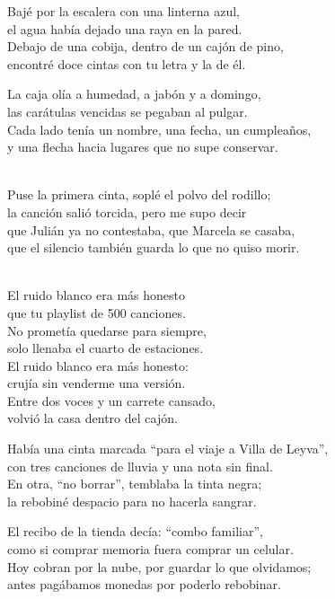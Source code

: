 \begin{lyrics}
Bajé por la escalera con una linterna azul,\\
el agua había dejado una raya en la pared.\\
Debajo de una cobija, dentro de un cajón de pino,\\
encontré doce cintas con tu letra y la de él.

La caja olía a humedad, a jabón y a domingo,\\
las carátulas vencidas se pegaban al pulgar.\\
Cada lado tenía un nombre, una fecha, un cumpleaños,\\
y una flecha hacia lugares que no supe conservar.

\\
Puse la primera cinta, soplé el polvo del rodillo;\\
la canción salió torcida, pero me supo decir\\
que Julián ya no contestaba, que Marcela se casaba,\\
que el silencio también guarda lo que no quiso morir.

\\
El ruido blanco era más honesto\\
que tu playlist de 500 canciones.\\
No prometía quedarse para siempre,\\
solo llenaba el cuarto de estaciones.\\
El ruido blanco era más honesto:\\
crujía sin venderme una versión.\\
Entre dos voces y un carrete cansado,\\
volvió la casa dentro del cajón.

Había una cinta marcada “para el viaje a Villa de Leyva”,\\
con tres canciones de lluvia y una nota sin final.\\
En otra, “no borrar”, temblaba la tinta negra;\\
la rebobiné despacio para no hacerla sangrar.

El recibo de la tienda decía: “combo familiar”,\\
como si comprar memoria fuera comprar un celular.\\
Hoy cobran por la nube, por guardar lo que olvidamos;\\
antes pagábamos monedas por poderlo rebobinar.


\end{lyrics}
